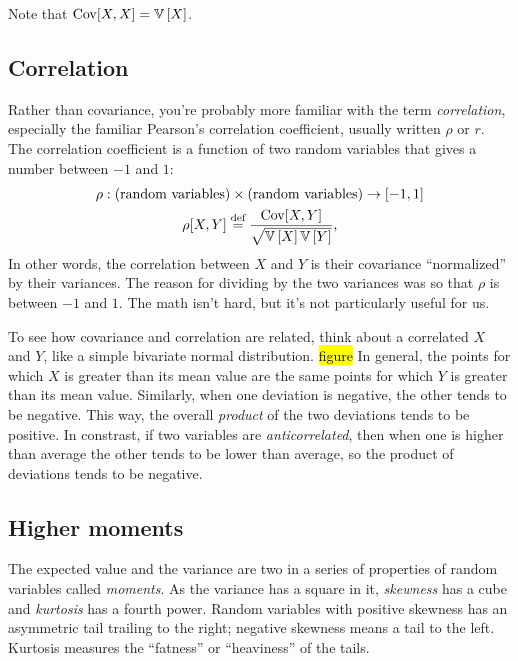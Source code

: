 Note that $\mathrm{Cov}\!\left[{X, X}\right] = \mathbb{V}\left[{X}\right]$.

\subsection{Correlation}

Rather than covariance, you're probably more familiar with the term
\emph{correlation}, especially the familiar Pearson's correlation coefficient,
usually written $\rho$ or $r$. The correlation coefficient is a function of
two random variables that gives a number between $-1$ and $1$:
\begin{gather*}
\rho : (\text{random variables}) \times (\text{random variables}) \to [-1, 1] \\
\rho[X, Y] \stackrel{\text{def}}{=} \frac{\mathrm{Cov}\!\left[{X, Y}\right]}{\sqrt{\mathbb{V}\left[{X}\right] \mathbb{V}\left[{Y}\right]}},
\end{gather*}
In other words, the correlation between $X$ and $Y$ is their covariance
``normalized'' by their variances. The reason for dividing by the two
variances was so that $\rho$ is between $-1$ and $1$. The math isn't hard, but
it's not particularly useful for us.


To see how covariance and correlation are related, think about a correlated
$X$ and $Y$, like a simple bivariate normal distribution. \hl{figure} In
general, the points for which $X$ is greater than its mean value are the same
points for which $Y$ is greater than its mean value. Similarly, when one
deviation is negative, the other tends to be negative. This way, the overall
\emph{product} of the two deviations tends to be positive. In constrast, if
two variables are \emph{anticorrelated}, then when one is higher than average
the other tends to be lower than average, so the product of deviations tends
to be negative.

\subsection{Higher moments}

The expected value and the variance are two in a series of properties of
random variables called \emph{moments}. As the variance has a square in it,
\emph{skewness} has a cube and \emph{kurtosis} has a fourth power. Random
variables with positive skewness has an asymmetric tail trailing to the right;
negative skewness means a tail to the left. Kurtosis measures the ``fatness''
or ``heaviness'' of the tails.
